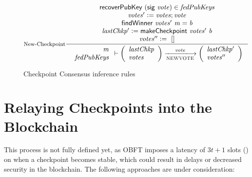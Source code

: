 \begin{figure}[tbh]
  \begin{equation}\label{eq:new-checkpoint}
    \inference[New-Checkpoint]
    {
      \fun{recoverPubKey}~(\fun{sig}~\var{vote}) \in \var{fedPubKeys} \\
      \var{votes'}\leteq\var{votes};\var{vote} \\
      \fun{findWinner}~\var{votes'}~\var{m} = \var{b} \\
      \var{lastChkp'}\leteq\fun{makeCheckpoint}~\var{votes'}~\var{b} \\
      \var{votes''}\leteq~[]
    }
    {
      \begin{array}{r}
        \var{m}\\
        \var{fedPubKeys}
      \end{array}
      \vdash
      \left(
      \begin{array}{l}
        \var{lastChkp}\\
        \var{votes}\\
      \end{array}
      \right)
      \trans{NEWVOTE}{\var{vote}}
      \left(
      \begin{array}{l}
        \var{lastChkp'}\\
        \var{votes''}\\
      \end{array}
      \right)
    }
  \end{equation}
  \caption{Checkpoint Consensus inference rules}
  \label{fig:checkpoint-consensus-rules}
\end{figure}

\clearpage
\section{Relaying Checkpoints into the Blockchain}

This process is not fully defined yet, as OBFT imposes a latency of $3t + 1$ slots (\cite{obft-paper}) on when a checkpoint becomes stable, which could result in delays or decreased security in the blockchain. The following approaches are under consideration:

